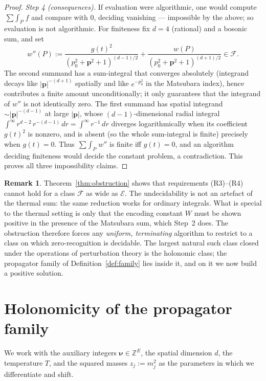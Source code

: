 \documentclass{amsart}
\theoremstyle{definition}
\newtheorem{remark}{Remark}
\begin{document}
\begin{proof}
\emph{Step 4 (consequences).}
If evaluation were algorithmic, one would compute
$\mathop{\sum\!\!\int}_P f$ and compare with $0$, deciding vanishing ---
impossible by the above; so evaluation is not algorithmic. For finiteness fix
$d=4$ (rational) and a bosonic sum, and set
\[
  w''(P):=\frac{g(t)^2}{(p_0^2+\mathbf p^2+1)^{(d-1)/2}}+\frac{w(P)}{(p_0^2+\mathbf p^2+1)^{(d+1)/2}}\in\mathcal F .
\]
The second summand has a sum-integral that converges absolutely (integrand
decays like $|\mathbf p|^{-(d+1)}$ spatially and like $e^{-p_0^2}$ in the
Matsubara index), hence contributes a finite amount unconditionally; it only
guarantees that the integrand of $w''$ is not identically zero. The first
summand has spatial integrand $\sim|\mathbf p|^{-(d-1)}$ at large
$|\mathbf p|$, whose $(d-1)$-dimensional radial integral
$\int^\infty r^{d-2}\,r^{-(d-1)}\,dr=\int^\infty r^{-1}\,dr$ diverges
logarithmically when its coefficient $g(t)^2$ is nonzero, and is absent (so the
whole sum-integral is finite) precisely when $g(t)=0$. Thus
$\mathop{\sum\!\!\int}_P w''$ is finite iff $g(t)=0$, and an algorithm
deciding finiteness would decide the constant problem, a contradiction. This
proves all three impossibility claims.
\end{proof}

\begin{remark}
Theorem~\ref{thm:obstruction} shows that requirements (R3)--(R4) cannot hold
for a class $\mathcal F$ as wide as $\mathcal E$. The undecidability is not an
artefact of the thermal sum: the same reduction works for ordinary integrals.
What is special to the thermal setting is only that the encoding constant $W$
must be shown positive in the presence of the Matsubara sum, which Step~2 does.
The obstruction therefore forces any \emph{uniform, terminating} algorithm to
restrict to a class on which zero-recognition is decidable. The largest
natural such class closed under the operations of perturbation theory is the
holonomic class; the propagator family of Definition~\ref{def:family} lies
inside it, and on it we now build a positive solution.
\end{remark}

\section{Holonomicity of the propagator family}

We work with the auxiliary integers $\boldsymbol\nu\in\mathbb Z^E$, the
spatial dimension $d$, the temperature $T$, and the squared masses
$z_j:=m_j^2$ as the parameters in which we differentiate and shift.
\end{document}
